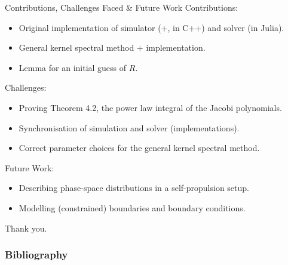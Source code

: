 \documentclass[aspectratio=169, hyperref={colorlinks=true}]{beamer}
\begin{document}
  \begin{frame}{Contributions, Challenges Faced \& Future Work}
    Contributions:
    \begin{itemize}
      \tightlist
      \item Original implementation of simulator (+, in C++) and solver (in Julia).
      \item General kernel spectral method + implementation.
      \item Lemma for an initial guess of $R$.
    \end{itemize}

    Challenges:
    \begin{itemize}
      \tightlist
      \item Proving Theorem 4.2, the power law integral of the Jacobi polynomials.
      \item Synchronisation of simulation and solver (implementations).
      \item Correct parameter choices for the general kernel spectral method.
    \end{itemize}

    Future Work:
    \begin{itemize}
      \tightlist
      \item Describing phase-space distributions in a self-propulsion setup.
      \item Modelling (constrained) boundaries and boundary conditions.
    \end{itemize}
  \end{frame}

  \begin{frame}{}
    Thank you.
  \end{frame}

  \begin{frame}[allowframebreaks]
    \frametitle{Bibliography}
    \printbibliography[heading=bibnumbered]
    \printnoidxglossary[type=acronym, title={Acronyms}]
  \end{frame}
\end{document}
